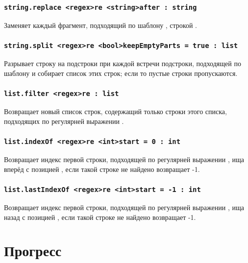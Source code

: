 \documentclass[a4paper, 14pt]{extarticle}
\begin{document}
\subsubsection{\lstinline|string.replace <regex>re <string>after : string|}

Заменяет каждый фрагмент, подходящий по шаблону , строкой .

\subsubsection{\lstinline|string.split <regex>re <bool>keepEmptyParts = true : list|}

Разрывает строку на подстроки при каждой встречи подстроки, подходящей по шаблону  и собирает список этих строк; если  то пустые строки пропускаются.

\subsubsection{\lstinline|list.filter <regex>re : list|}

Возвращает новый список строк, содержащий только строки этого списка, подходящих по регулярней выражении .

\subsubsection{\lstinline|list.indexOf <regex>re <int>start = 0 : int|}

Возвращает индекс первой строки, подходящей по регулярней выражении , ища вперёд с позицией , если такой строке не найдено возвращает -1.

\subsubsection{\lstinline|list.lastIndexOf <regex>re <int>start = -1 : int|}

Возвращает индекс первой строки, подходящей по регулярней выражении , ища назад с позицией , если такой строке не найдено возвращает -1.


\newpage
\section{Прогресс}
\end{document}

